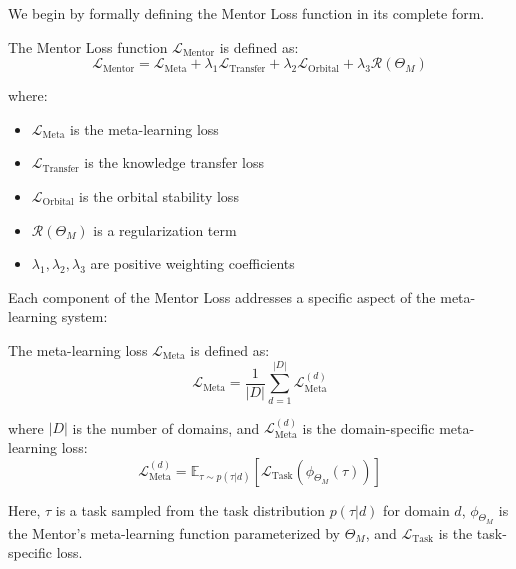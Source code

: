 We begin by formally defining the Mentor Loss function in its complete form.

\begin{definition}
The Mentor Loss function $\mathcal{L}_{\text{Mentor}}$ is defined as:
\begin{equation}
\mathcal{L}_{\text{Mentor}} = \mathcal{L}_{\text{Meta}} + \lambda_1 \mathcal{L}_{\text{Transfer}} + \lambda_2 \mathcal{L}_{\text{Orbital}} + \lambda_3 \mathcal{R}(\Theta_M)
\end{equation}

where:
\begin{itemize}
    \item $\mathcal{L}_{\text{Meta}}$ is the meta-learning loss
    \item $\mathcal{L}_{\text{Transfer}}$ is the knowledge transfer loss
    \item $\mathcal{L}_{\text{Orbital}}$ is the orbital stability loss
    \item $\mathcal{R}(\Theta_M)$ is a regularization term
    \item $\lambda_1, \lambda_2, \lambda_3$ are positive weighting coefficients
\end{itemize}
\end{definition}

Each component of the Mentor Loss addresses a specific aspect of the meta-learning system:

\begin{definition}
The meta-learning loss $\mathcal{L}_{\text{Meta}}$ is defined as:
\begin{equation}
\mathcal{L}_{\text{Meta}} = \frac{1}{|D|}\sum_{d=1}^{|D|} \mathcal{L}_{\text{Meta}}^{(d)}
\end{equation}

where $|D|$ is the number of domains, and $\mathcal{L}_{\text{Meta}}^{(d)}$ is the domain-specific meta-learning loss:
\begin{equation}
\mathcal{L}_{\text{Meta}}^{(d)} = \mathbb{E}_{\tau \sim p(\tau|d)}\left[ \mathcal{L}_{\text{Task}}(\phi_{\Theta_M}(\tau)) \right]
\end{equation}

Here, $\tau$ is a task sampled from the task distribution $p(\tau|d)$ for domain $d$, $\phi_{\Theta_M}$ is the Mentor's meta-learning function parameterized by $\Theta_M$, and $\mathcal{L}_{\text{Task}}$ is the task-specific loss.
\end{definition}

